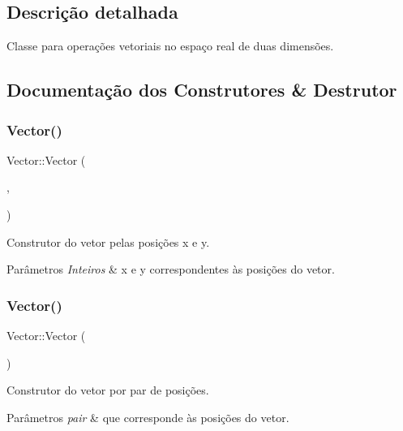 \subsection{Descrição detalhada}
Classe para operações vetoriais no espaço real de duas dimensões. 

\subsection{Documentação dos Construtores \& Destrutor}
\mbox{\label{classVector_a1d3e69fe5741740aa40e7b5fd2cbf0e8}} 
\subsubsection{\texorpdfstring{Vector()}{Vector()}\hspace{0.1cm}{\footnotesize\ttfamily [1/2]}}
{\footnotesize\ttfamily Vector\+::\+Vector (\begin{DoxyParamCaption}\item[{float}]{,  }\item[{float}]{ }\end{DoxyParamCaption})}

Construtor do vetor pelas posições x e y. 
\begin{DoxyParams}{Parâmetros}
{\em Inteiros} & x e y correspondentes às posições do vetor. \\
\hline
\end{DoxyParams}
\mbox{\label{classVector_abdb4dca6245e33a8661d1ab02bb50016}} 
\subsubsection{\texorpdfstring{Vector()}{Vector()}\hspace{0.1cm}{\footnotesize\ttfamily [2/2]}}
{\footnotesize\ttfamily Vector\+::\+Vector (\begin{DoxyParamCaption}\item[{pair$<$ float, float $>$}]{ }\end{DoxyParamCaption})}

Construtor do vetor por par de posições. 
\begin{DoxyParams}{Parâmetros}
{\em pair} & que corresponde às posições do vetor. \\
\hline
\end{DoxyParams}


